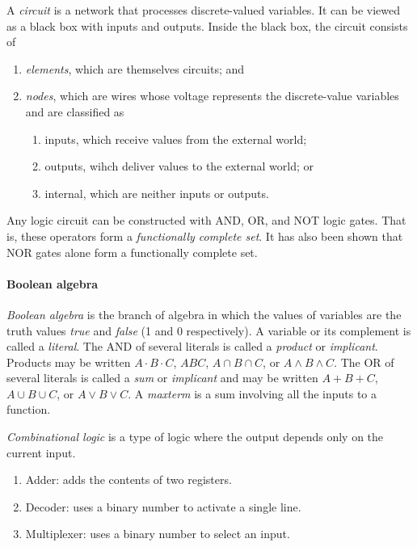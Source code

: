 \begin{definition}[Circuit]
	A \emph{circuit} is a network that processes discrete-valued variables.
	It can be viewed as a black box with inputs and outputs.
	Inside the black box, the circuit consists of
	\begin{enumerate}
		\item \emph{elements}, which are themselves circuits; and
		\item \emph{nodes}, which are wires whose voltage represents the
			discrete-value variables and are classified as
		\begin{enumerate}
			\item inputs, which receive values from the external world;
			\item outputs, wihch deliver values to the external world; or
			\item internal, which are neither inputs or outputs.
		\end{enumerate}
	\end{enumerate}
\end{definition}

Any logic circuit can be constructed with AND, OR, and NOT logic gates.
That is, these operators form a \emph{functionally complete set}.
It has also been shown that NOR gates alone form a functionally complete
set.

\paragraph{Boolean algebra}
\emph{Boolean algebra} is the branch of algebra in which the values of variables
are the truth values \emph{true} and \emph{false} (1 and 0 respectively).
A variable or its complement is called a \emph{literal}.
The AND of several literals is called a \emph{product} or \emph{implicant}.
Products may be written $A \cdot B \cdot C$, $ABC$, $A \cap B \cap C$, or
$A \land B \land C$.
The OR of several literals is called a \emph{sum} or \emph{implicant} and may
be written $A + B + C$, $A \cup B \cup C$, or $A \lor B \lor C$.
A \emph{maxterm} is a sum involving all the inputs to a function.

\begin{definition}
	\emph{Combinational logic} is a type of logic
	where the output depends only on the current input.
\end{definition}

\begin{examples}
	\begin{enumerate}
		\item Adder: adds the contents of two registers.
		\item Decoder: uses a binary number to activate a single line.
		\item Multiplexer: uses a binary number to select an input.
	\end{enumerate}
\end{examples}

